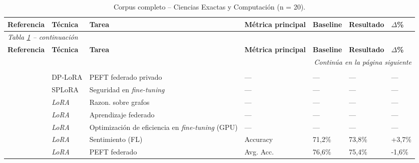 \begin{longtable}{p{3.5cm} p{1.7cm} p{3.0cm} p{1.8cm} p{1.3cm} p{1.3cm} p{0.9cm}}
\caption{Corpus completo -- Ciencias Exactas y Computación (n = 20).} \label{tab:apx_cec} \\
\toprule
\scriptsize\textbf{Referencia} & \scriptsize\textbf{Técnica} & \scriptsize\textbf{Tarea} & \scriptsize\textbf{Métrica principal} & \scriptsize\textbf{Baseline} & \scriptsize\textbf{Resultado} & \scriptsize\textbf{$\Delta$\%} \\
\midrule
\endfirsthead
\multicolumn{7}{l}{\scriptsize\textit{Tabla \ref{tab:apx_cec} -- continuación}} \\[2pt]
\toprule
\scriptsize\textbf{Referencia} & \scriptsize\textbf{Técnica} & \scriptsize\textbf{Tarea} & \scriptsize\textbf{Métrica principal} & \scriptsize\textbf{Baseline} & \scriptsize\textbf{Resultado} & \scriptsize\textbf{$\Delta$\%} \\
\midrule
\endhead
\midrule
\multicolumn{7}{r}{\scriptsize\textit{Continúa en la página siguiente}} \\
\endfoot
\bottomrule
\endlastfoot
\multicolumn{7}{l}{\scriptsize\textbf{\textit{PEFT}}} \\[2pt]
\scriptsize\autocite{liu2025federated} & \scriptsize DP-LoRA & \scriptsize PEFT federado privado & \scriptsize --- & \scriptsize --- & \scriptsize --- & \scriptsize --- \\
\scriptsize\autocite{ao2025lora} & \scriptsize SPLoRA & \scriptsize Seguridad en \textit{fine-tuning} & \scriptsize --- & \scriptsize --- & \scriptsize --- & \scriptsize --- \\
\scriptsize\autocite{chen2025glr} & \scriptsize\textit{LoRA} & \scriptsize Razon. sobre grafos & \scriptsize --- & \scriptsize --- & \scriptsize --- & \scriptsize --- \\
\scriptsize\autocite{elbakary2025mira} & \scriptsize\textit{LoRA} & \scriptsize Aprendizaje federado & \scriptsize --- & \scriptsize --- & \scriptsize --- & \scriptsize --- \\
\scriptsize\autocite{gogineni2025ft} & \scriptsize\textit{LoRA} & \scriptsize Optimización de eficiencia en \textit{fine-tuning} (GPU) & \scriptsize --- & \scriptsize --- & \scriptsize --- & \scriptsize --- \\
\scriptsize\autocite{iftikhar2025peft} & \scriptsize\textit{LoRA} & \scriptsize Sentimiento (FL) & \scriptsize Accuracy & \scriptsize 71,2\% & \scriptsize 73,8\% & \scriptsize +3,7\% \\
\scriptsize\autocite{li2025federated} & \scriptsize\textit{LoRA} & \scriptsize PEFT federado & \scriptsize Avg. Acc. & \scriptsize 76,6\% & \scriptsize 75,4\% & \scriptsize -1,6\% \\

\end{longtable}
